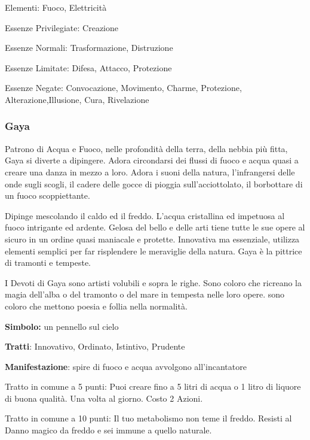 \documentclass[a4paper,11pt,twoside,openany]{book}
\begin{document}
{\bigskip

Elementi: Fuoco, Elettricità

\bigskip

Essenze Privilegiate: Creazione

Essenze Normali: Trasformazione, Distruzione

Essenze Limitate: Difesa, Attacco, Protezione

Essenze Negate: Convocazione, Movimento, Charme, Protezione, Alterazione,Illusione, Cura, Rivelazione

\subsubsection{Gaya}

\label{gaya}

Patrono di Acqua e Fuoco, nelle profondità della terra, della nebbia più fitta, Gaya si diverte a dipingere. Adora circondarsi dei flussi di fuoco e acqua quasi a creare una danza in mezzo a loro. Adora i suoni della natura, l'infrangersi delle onde sugli scogli, il cadere delle gocce di pioggia sull'acciottolato, il borbottare di un fuoco scoppiettante. 

Dipinge mescolando il caldo ed il freddo. L'acqua cristallina ed impetuosa al fuoco intrigante ed ardente. Gelosa del bello e delle arti tiene tutte le sue opere al sicuro in un ordine quasi maniacale e protette. Innovativa ma essenziale, utilizza elementi semplici per far risplendere le meraviglie della natura. Gaya è la pittrice di tramonti e tempeste.

I Devoti di Gaya sono artisti volubili e sopra le righe. Sono coloro che ricreano la magia dell'alba o del tramonto o del mare in tempesta nelle loro opere. sono coloro che mettono poesia e follia nella normalità. 

\textbf{Simbolo:} un pennello sul cielo

\textbf{Tratti}: Innovativo, Ordinato, Istintivo, Prudente

\textbf{Manifestazione}: spire di fuoco e acqua avvolgono all'incantatore

\bigskip

Tratto in comune a 5 punti: Puoi creare fino a 5 litri di acqua o 1 litro di liquore di buona qualità. Una volta al giorno. Costo 2 Azioni.

Tratto in comune a 10 punti: Il tuo metabolismo non teme il freddo. Resisti al Danno magico da freddo e sei immune a quello naturale.

}
\end{document}
